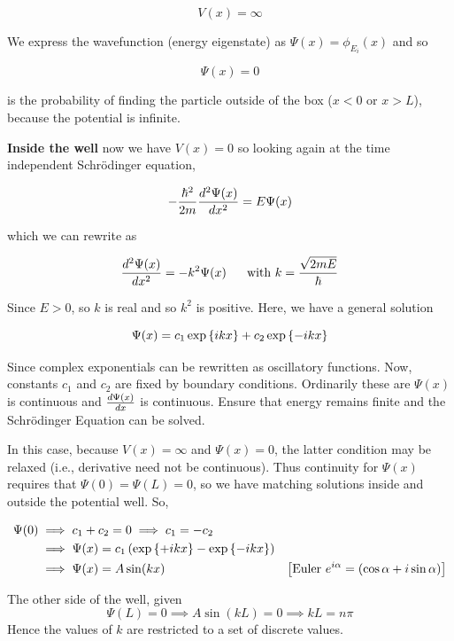 \documentclass[english, 11pt]{article}
\begin{document}
\begin{itemize}
        \[ V(x) = \infty \]

        We express the wavefunction (energy eigenstate) as $\Psi(x) = \phi_{E_i}(x)$ and so

        \[ \Psi(x) = 0 \]

        is the probability of finding the particle outside of the box ($x < 0$ or $x > L$), because the potential is infinite.

        \textbf{Inside the well} now we have $V(x) = 0$ so looking again at the time independent Schrödinger equation,

        \[ -\frac{\hbar^2}{2m}\frac{d^2\Psi(x)}{dx^2} = E\Psi(x) \]

        which we can rewrite as

        \[ \f{d^2\Psi(x)}{dx^2} = -k^2\Psi(x) \ \ \ \ \ \mbox{with } k = \f{\sqrt{2mE}}{\hbar} \]

        Since $E>0$, so $k$ is real and so $k^2$ is positive. Here, we have a general solution

        \[ \Psi(x) = c_1 \exp \left\{ ikx \right\} + c_2\exp \left\{ -ikx \right\} \]

        Since complex exponentials can be rewritten as oscillatory functions. Now, constants $c_1$ and $c_2$ are fixed by boundary conditions. Ordinarily these are $\Psi(x)$ is continuous and $\frac{d\Psi(x)}{dx}$ is continuous. Ensure that energy remains finite and the Schrödinger Equation can be solved.
        \newline

        In this case, because $V(x) = \infty$ and $\Psi(x) = 0$, the latter condition may be relaxed (i.e., derivative need not be continuous). Thus continuity for $\Psi(x)$ requires that $\Psi(0) = \Psi(L) = 0$, so we have matching solutions inside and outside the potential well. So,

        \begin{align*}
          \Psi(0) & \implies c_1 + c_2 = 0 \implies c_1 = - c_2 \\
          & \implies \Psi(x) = c_1 \left( \exp \left\{ +ikx \right\} - \exp \left\{ -ikx \right\} \right) \\
          & \implies \Psi(x) = A\sin(kx) & \left[ \mbox{Euler } e^{i\alpha} = \left( \cos\alpha + i\sin\alpha \right)\right]
        \end{align*}

        The other side of the well, given
        \[ \Psi(L) = 0 \implies A\sin(kL) = 0 \implies kL=n\pi \]
        Hence the values of $k$ are restricted to a set of discrete values.


\end{itemize}
\end{document}
